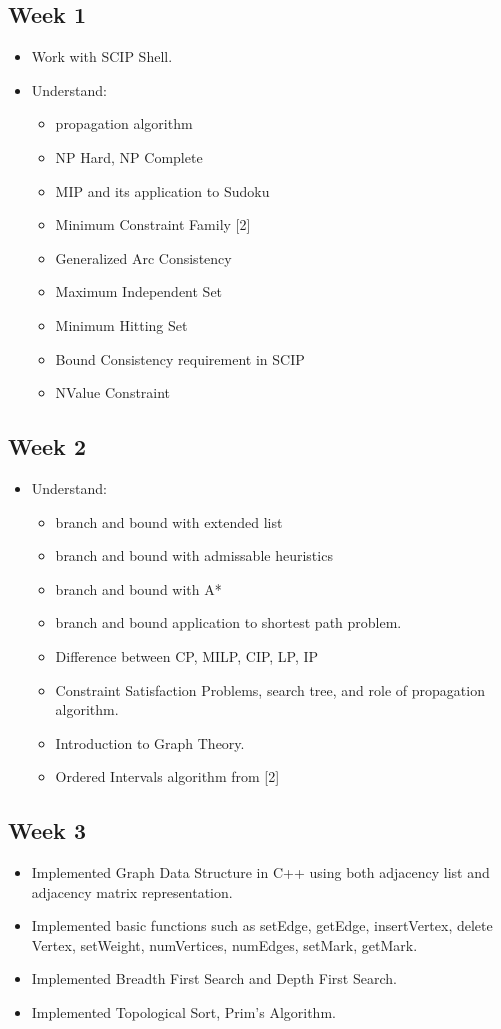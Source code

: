 \documentclass[a4paper,12pt]{article}
\begin{document}
\subsection{Week 1}
	\begin{itemize}
		\item Work with SCIP Shell. 
		\item Understand: 
		\begin{itemize}
			\item propagation algorithm
			\item NP Hard, NP Complete
			\item MIP and its application to Sudoku 
			\item Minimum Constraint Family [2]
			\item Generalized Arc Consistency 
			\item Maximum Independent Set
			\item Minimum Hitting Set 
			\item Bound Consistency requirement in SCIP 
			\item NValue Constraint 
		\end{itemize} 
	\end{itemize} 

\subsection{Week 2}
	\begin{itemize}
		\item Understand: 
		\begin{itemize}
			\item branch and bound with extended list
			\item branch and bound with admissable heuristics
			\item branch and bound with A* 
			\item branch and bound application to shortest path problem.
			\item Difference between CP, MILP, CIP, LP, IP
			\item Constraint Satisfaction Problems, search tree, and role of propagation algorithm. 
			\item Introduction to Graph Theory. 
			\item Ordered Intervals algorithm from [2] 
		\end{itemize} 
	\end{itemize} 
	

\subsection{Week 3}
	\begin{itemize}
		\item Implemented Graph Data Structure in C++ using both adjacency list and adjacency matrix representation. 
		\item Implemented basic functions such as setEdge, getEdge,  insertVertex, delete Vertex, setWeight, numVertices, numEdges, setMark, getMark. 
		\item Implemented Breadth First Search and Depth First Search.
		\item Implemented Topological Sort, Prim's Algorithm. 
	\end{itemize} 
\end{document}
